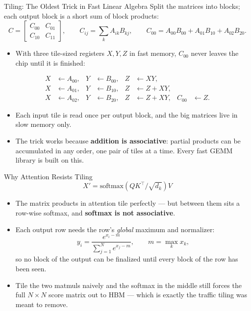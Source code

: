 \begin{frame}{Tiling: The Oldest Trick in Fast Linear Algebra}
    Split the matrices into blocks; each output block is a short sum of block products:
    \[
        C =
        \begin{bmatrix}
            C_{00} & C_{01} \\
            C_{10} & C_{11}
        \end{bmatrix},
        \qquad
        C_{ij} = \sum_{k} A_{ik} B_{kj},
        \qquad
        C_{00} = A_{00}B_{00} + A_{01}B_{10} + A_{02}B_{20}.
    \]
    \begin{itemize}\itemsep0.3em
        \item With three tile-sized registers $X, Y, Z$ in fast memory, $C_{00}$ never leaves the chip until it is finished:
    \end{itemize}
    \vspace{-0.5em}
    \[
        \begin{aligned}
            X &\leftarrow A_{00}, & Y &\leftarrow B_{00}, & Z &\leftarrow XY, \\
            X &\leftarrow A_{01}, & Y &\leftarrow B_{10}, & Z &\leftarrow Z + XY, \\
            X &\leftarrow A_{02}, & Y &\leftarrow B_{20}, & Z &\leftarrow Z + XY, & C_{00} &\leftarrow Z.
        \end{aligned}
    \]
    \vspace{-0.5em}
    \begin{itemize}\itemsep0.3em
        \item Each input tile is read once per output block, and the big matrices live in slow memory only.
        \item The trick works because \textbf{addition is associative}: partial products can be accumulated in any order, one pair of tiles at a time. Every fast GEMM library is built on this.
    \end{itemize}
\end{frame}

\begin{frame}{Why Attention Resists Tiling}
    \[
        X' = \mathrm{softmax}\!\left(QK^\top / \sqrt{d_k}\right) V
    \]
    \begin{itemize}\itemsep0.5em
        \item The matrix products in attention tile perfectly --- but between them sits a row-wise softmax, and \textbf{softmax is not associative}.
        \item Each output row needs the row's \emph{global} maximum and normalizer:
        \[
            y_i = \frac{e^{x_i - m}}{\sum_{j=1}^{N} e^{x_j - m}},
            \qquad m = \max_k x_k,
        \]
        so no block of the output can be finalized until every block of the row has been seen.
        \item Tile the two matmuls naively and the softmax in the middle still forces the full $N \times N$ score matrix out to HBM --- which is exactly the traffic tiling was meant to remove.
    \end{itemize}
\end{frame}

